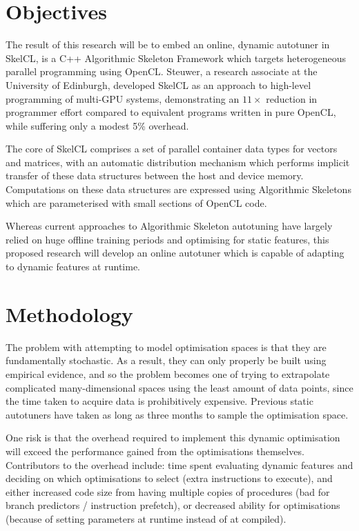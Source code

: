 
\section*{Objectives}
The result of this research will be to embed an online, dynamic
autotuner in SkelCL, is a C++ Algorithmic Skeleton Framework which
targets heterogeneous parallel programming using OpenCL. Steuwer, a
research associate at the University of Edinburgh, developed SkelCL as
an approach to high-level programming of multi-GPU systems,
demonstrating an $11\times$ reduction in programmer effort compared to
equivalent programs written in pure OpenCL, while suffering only a
modest 5\% overhead.

The core of SkelCL comprises a set of parallel container data types
for vectors and matrices, with an automatic distribution mechanism
which performs implicit transfer of these data structures between the
host and device memory. Computations on these data structures are
expressed using Algorithmic Skeletons which are parameterised with
small sections of OpenCL code.

Whereas current approaches to Algorithmic Skeleton autotuning have
largely relied on huge offline training periods and optimising for
static features, this proposed research will develop an online
autotuner which is capable of adapting to dynamic features at runtime.

\section*{Methodology}
The problem with attempting to model optimisation spaces is that they
are fundamentally stochastic. As a result, they can only properly be
built using empirical evidence, and so the problem becomes one of
trying to extrapolate complicated many-dimensional spaces using the
least amount of data points, since the time taken to acquire data is
prohibitively expensive. Previous static autotuners have taken as long
as three months to sample the optimisation space.

One risk is that the overhead required to implement this dynamic
optimisation will exceed the performance gained from the optimisations
themselves. Contributors to the overhead include: time spent
evaluating dynamic features and deciding on which optimisations to
select (extra instructions to execute), and either increased code size
from having multiple copies of procedures (bad for branch predictors /
instruction prefetch), or decreased ability for optimisations (because
of setting parameters at runtime instead of at compiled).

